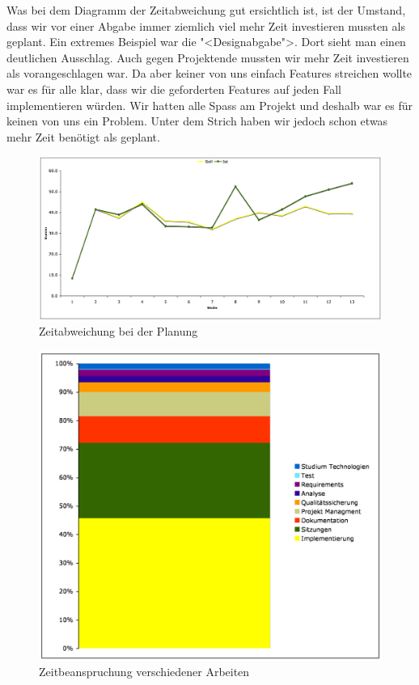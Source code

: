 \documentclass[12pt,halfparskip]{scrartcl}
\begin{document}
Was bei dem Diagramm der Zeitabweichung gut ersichtlich ist, ist der Umstand, dass wir vor einer Abgabe immer ziemlich viel mehr Zeit investieren mussten als geplant. Ein extremes Beispiel war die "<Designabgabe">. Dort sieht man einen deutlichen Ausschlag. Auch gegen Projektende mussten wir mehr Zeit investieren als vorangeschlagen war. Da aber keiner von uns einfach Features streichen wollte war es für alle klar, dass wir die geforderten Features auf jeden Fall implementieren würden. Wir hatten alle Spass am Projekt und deshalb war es für keinen von uns ein Problem. Unter dem Strich haben wir jedoch schon etwas mehr Zeit benötigt als geplant.

\begin{figure}[h]
	\centering
	\includegraphics[width=0.8 \textwidth]{zeitabweichung}
	\caption{Zeitabweichung bei der Planung}
	\label{fig:zeitabweichung}
\end{figure}

\begin{figure}[h]
	\centering
	\includegraphics[width=0.8 \textwidth]{zeitbeachspruchung_arbeiten}
	\caption{Zeitbeanspruchung verschiedener Arbeiten}
	\label{fig:zeitbeachspruchung_arbeiten}
\end{figure}
\end{document}
